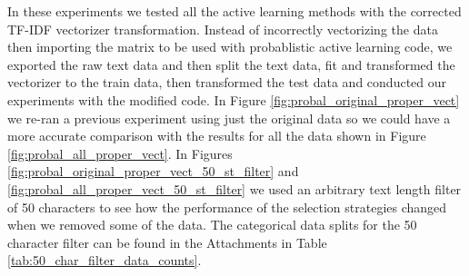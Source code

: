 In these experiments we tested all the active learning methods with the corrected TF-IDF vectorizer transformation. Instead of incorrectly vectorizing the data then importing the matrix to be used with \cite{kottke2021toward} probablistic active learning code, we exported the raw text data and then split the text data, fit and transformed the vectorizer to the train data, then transformed the test data and conducted our experiments with the modified code. In Figure \ref{fig:probal_original_proper_vect} we re-ran a previous experiment using just the original data so we could have a more accurate comparison with the results for all the data shown in Figure \ref{fig:probal_all_proper_vect}. In Figures \ref{fig:probal_original_proper_vect_50_st_filter} and \ref{fig:probal_all_proper_vect_50_st_filter} we used an arbitrary text length filter of 50 characters to see how the performance of the selection strategies changed when we removed some of the data. The categorical data splits for the 50 character filter can be found in the Attachments in Table \ref{tab:50_char_filter_data_counts}.

